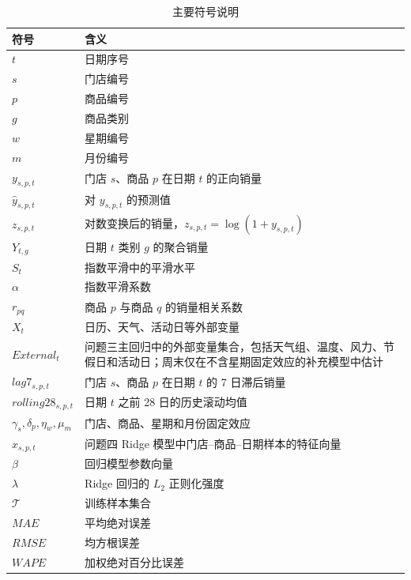 \begin{table}[H]
\centering
\caption{主要符号说明}
\label{tab:symbols}
\begin{tabular}{p{3.1cm}p{10.4cm}}
\toprule
符号 & 含义 \\
\midrule
$t$ & 日期序号 \\
$s$ & 门店编号 \\
$p$ & 商品编号 \\
$g$ & 商品类别 \\
$w$ & 星期编号 \\
$m$ & 月份编号 \\
$y_{s,p,t}$ & 门店 $s$、商品 $p$ 在日期 $t$ 的正向销量 \\
$\hat y_{s,p,t}$ & 对 $y_{s,p,t}$ 的预测值 \\
$z_{s,p,t}$ & 对数变换后的销量，$z_{s,p,t}=\log(1+y_{s,p,t})$ \\
$Y_{t,g}$ & 日期 $t$ 类别 $g$ 的聚合销量 \\
$S_t$ & 指数平滑中的平滑水平 \\
$\alpha$ & 指数平滑系数 \\
$r_{pq}$ & 商品 $p$ 与商品 $q$ 的销量相关系数 \\
$X_t$ & 日历、天气、活动日等外部变量 \\
$External_t$ & 问题三主回归中的外部变量集合，包括天气组、温度、风力、节假日和活动日；周末仅在不含星期固定效应的补充模型中估计 \\
$lag7_{s,p,t}$ & 门店 $s$、商品 $p$ 在日期 $t$ 的 7 日滞后销量 \\
$rolling28_{s,p,t}$ & 日期 $t$ 之前 28 日的历史滚动均值 \\
$\gamma_s,\delta_p,\eta_w,\mu_m$ & 门店、商品、星期和月份固定效应 \\
$x_{s,p,t}$ & 问题四 Ridge 模型中门店--商品--日期样本的特征向量 \\
$\beta$ & 回归模型参数向量 \\
$\lambda$ & Ridge 回归的 $L_2$ 正则化强度 \\
$\mathcal T$ & 训练样本集合 \\
$MAE$ & 平均绝对误差 \\
$RMSE$ & 均方根误差 \\
$WAPE$ & 加权绝对百分比误差 \\
\bottomrule
\end{tabular}
\end{table}
